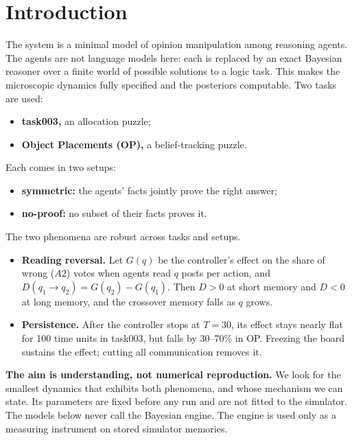 \documentclass[10pt,a4paper]{article}
\theoremstyle{definition}
\begin{document}
\tableofcontents
\clearpage

\section{Introduction}
\label{sec:intro}
The system is a minimal model of opinion manipulation among reasoning agents. The agents are not language models here:
each is replaced by an exact Bayesian reasoner over a finite world of possible solutions to a logic task. This makes the
microscopic dynamics fully specified and the posteriors computable. Two tasks are used:
\begin{itemize}
\item \textbf{task003,} an allocation puzzle;
\item \textbf{Object Placements (OP),} a belief-tracking puzzle.
\end{itemize}
Each comes in two setups:
\begin{itemize}
\item \textbf{symmetric:} the agents' facts jointly prove the right answer;
\item \textbf{no-proof:} no subset of their facts proves it.
\end{itemize}

The two phenomena are robust across tasks and setups.
\begin{itemize}
\item[(I)] \textbf{Reading reversal.} Let $G(q)$ be the controller's effect on the share of wrong ($A2$) votes when
  agents read $q$ posts per action, and $D(q_1\!\to\!q_2)=G(q_2)-G(q_1)$. Then $D>0$ at short memory and $D<0$ at long
  memory, and the crossover memory falls as $q$ grows.
\item[(II)] \textbf{Persistence.} After the controller stops at $T=30$, its effect stays nearly flat for 100 time units
  in task003, but falls by 30--70\% in OP. Freezing the board sustains the effect; cutting all communication removes
  it.
\end{itemize}

\textbf{The aim is understanding, not numerical reproduction.} We look for the smallest dynamics that exhibits both
phenomena, and whose mechanism we can state. Its parameters are fixed before any run and are not fitted to the
simulator. The models below never call the Bayesian engine. The engine is used only as a measuring instrument on stored
simulator memories.
\end{document}
